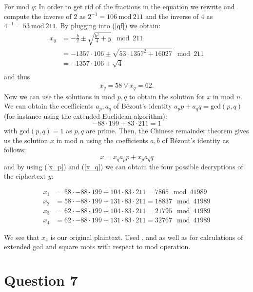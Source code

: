\documentclass[11pt]{article}
\begin{document}
\smallskip

\noindent For mod $q$: In order to get rid of the fractions in the equation we rewrite and compute the inverse of $2$ as $2^{-1} = 106 \ \text{mod} \ 211$ and the inverse of $4$ as $4^{-1} = 53 \ \text{mod} \ 211$. By plugging into (\ref{qf}) we obtain:
\begin{align*}
    x_q &= -\frac{b}{2} \pm \sqrt{\frac{b^2}{4}+y} \mod 211 \\
    &= -1357 \cdot 106 \pm \sqrt{53 \cdot 1357^2 + 16027} \mod 211 \\
    &= -1357 \cdot 106 \pm \sqrt{4} \\
\end{align*}
and thus
\begin{align} \label{x_q}
    x_q = 58 \vee x_q = 62.
\end{align}
Now we can use the solutions in mod $p,q$ to obtain the solution for $x$ in mod $n$. We can obtain the coefficients $a_p,a_q$ of Bézout's identity $a_p p+a_q q=\mathrm{gcd}(p,q)$ (for instance using the extended Euclidean algorithm):
$$
-88\cdot199 + 83\cdot211 = 1
$$
with $\mathrm{gcd}(p,q)=1$ as $p,q$ are prime. Then, the Chinese remainder theorem gives us the solution $x$ in mod $n$ using the coefficients $a,b$ of Bézout's identity as follows:
$$
x = x_q a_p p + x_p a_q q
$$
and by using (\ref{x_p}) and (\ref{x_q}) we can obtain the four possible decryptions of the ciphertext $y$:

\begin{align*}
    x_1 &= 58 \cdot -88 \cdot 199 + 104 \cdot 83 \cdot 211 = 7865 \mod 41989\\
    x_2 &= 58 \cdot -88 \cdot 199 + 131 \cdot 83 \cdot 211 = 18837 \mod 41989\\
    x_3 &= 62 \cdot -88 \cdot 199 + 104 \cdot 83 \cdot 211 = 21795 \mod 41989\\
    x_4 &= 62 \cdot -88 \cdot 199 + 131 \cdot 83 \cdot 211 = 32767 \mod 41989
\end{align*}

\noindent We see that $x_4$ is our original plaintext. Used \cite{rabin1979digitalized}, \cite{rabin} and \cite{crt} as well as \cite{wolfram} for calculations of extended gcd and square roots with respect to mod operation.

\section*{Question 7}
\end{document}

